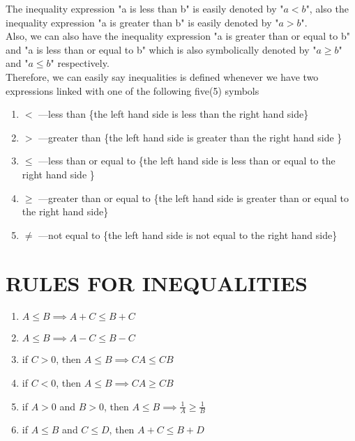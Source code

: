 \documentclass[12pt]{report}
\newcommand{\spn}[1]{\\[#1cm]}
\newcommand{\NI}{\noindent}
\begin{document}
	\NI The inequality expression "a is less than b" is easily denoted by "$a < b$", also the inequality expression "a is greater than b" is easily denoted by "$a > b$".\spn{-.4}
	
	\NI Also, we can also have the inequality expression "a is greater than or equal to b" and "a is less than or equal to b" which is also symbolically denoted by "$a \geq b$" and "$a \leq b$" respectively.\spn{-.3}
	
	\NI Therefore, we can easily say inequalities is defined whenever we have two expressions linked with one of the following five(5) symbols
	\begin{enumerate}
		\item $<$ \quad ---\quad less than \{the left hand side is less than the right hand side\}
		
		\item $>$ \quad ---\quad greater than \{the left hand side is greater than the right hand side \}
		
		\item $\leq$ \quad ---\quad less than or equal to \{the left hand side is less than or equal to the right hand side \}
		
		\item $\geq$ \quad ---\quad greater than or equal to \{the left hand side is greater than or equal to the right hand side\}
		
		\item $\neq$ \quad ---\quad not equal to \{the left hand side is not equal to the right hand side\}
	\end{enumerate}
	\section{RULES FOR INEQUALITIES}
	\begin{enumerate}
		\item $A\leq B \implies A + C \leq B + C$
		\item $A \leq B \implies A - C \leq B - C$
		\item if $C > 0$, then $A \leq B \implies CA \leq CB$
		\item if $C < 0$, then $A \leq B \implies CA \geq CB$
		\item if $A > 0$ and $B > 0$, then $A \leq B \implies \frac{1}{A} \geq \frac{1}{B}$
		\item if $A \leq B$ and $C \leq D$, then $A + C \leq B + D$
	\end{enumerate}
	
\end{document}
